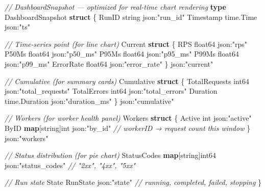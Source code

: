 \documentclass[
]{article}
\newenvironment{Shaded}{}{}
\newcommand{\CommentTok}[1]{\textcolor[rgb]{0.38,0.63,0.69}{\textit{#1}}}
\newcommand{\DataTypeTok}[1]{\textcolor[rgb]{0.56,0.13,0.00}{#1}}
\newcommand{\KeywordTok}[1]{\textcolor[rgb]{0.00,0.44,0.13}{\textbf{#1}}}
\newcommand{\NormalTok}[1]{#1}
\newcommand{\OperatorTok}[1]{\textcolor[rgb]{0.40,0.40,0.40}{#1}}
\newcommand{\StringTok}[1]{\textcolor[rgb]{0.25,0.44,0.63}{#1}}
\begin{document}
\begin{Shaded}
\begin{Highlighting}[]
\CommentTok{// DashboardSnapshot — optimized for real{-}time chart rendering}
\KeywordTok{type}\NormalTok{ DashboardSnapshot }\KeywordTok{struct} \OperatorTok{\{}
\NormalTok{    RunID     }\DataTypeTok{string}    \StringTok{\textasciigrave{}json:"run\_id"\textasciigrave{}}
\NormalTok{    Timestamp time}\OperatorTok{.}\NormalTok{Time }\StringTok{\textasciigrave{}json:"ts"\textasciigrave{}}

    \CommentTok{// Time{-}series point (for line chart)}
\NormalTok{    Current }\KeywordTok{struct} \OperatorTok{\{}
\NormalTok{        RPS       }\DataTypeTok{float64}       \StringTok{\textasciigrave{}json:"rps"\textasciigrave{}}
\NormalTok{        P50Ms     }\DataTypeTok{float64}       \StringTok{\textasciigrave{}json:"p50\_ms"\textasciigrave{}}
\NormalTok{        P95Ms     }\DataTypeTok{float64}       \StringTok{\textasciigrave{}json:"p95\_ms"\textasciigrave{}}
\NormalTok{        P99Ms     }\DataTypeTok{float64}       \StringTok{\textasciigrave{}json:"p99\_ms"\textasciigrave{}}
\NormalTok{        ErrorRate }\DataTypeTok{float64}       \StringTok{\textasciigrave{}json:"error\_rate"\textasciigrave{}}
    \OperatorTok{\}} \StringTok{\textasciigrave{}json:"current"\textasciigrave{}}

    \CommentTok{// Cumulative (for summary cards)}
\NormalTok{    Cumulative }\KeywordTok{struct} \OperatorTok{\{}
\NormalTok{        TotalRequests }\DataTypeTok{int64}         \StringTok{\textasciigrave{}json:"total\_requests"\textasciigrave{}}
\NormalTok{        TotalErrors   }\DataTypeTok{int64}         \StringTok{\textasciigrave{}json:"total\_errors"\textasciigrave{}}
\NormalTok{        Duration      time}\OperatorTok{.}\NormalTok{Duration }\StringTok{\textasciigrave{}json:"duration\_ms"\textasciigrave{}}
    \OperatorTok{\}} \StringTok{\textasciigrave{}json:"cumulative"\textasciigrave{}}

    \CommentTok{// Workers (for worker health panel)}
\NormalTok{    Workers }\KeywordTok{struct} \OperatorTok{\{}
\NormalTok{        Active  }\DataTypeTok{int}            \StringTok{\textasciigrave{}json:"active"\textasciigrave{}}
\NormalTok{        ByID    }\KeywordTok{map}\OperatorTok{[}\DataTypeTok{string}\OperatorTok{]}\DataTypeTok{int} \StringTok{\textasciigrave{}json:"by\_id"\textasciigrave{}} \CommentTok{// workerID → request count this window}
    \OperatorTok{\}} \StringTok{\textasciigrave{}json:"workers"\textasciigrave{}}

    \CommentTok{// Status distribution (for pie chart)}
\NormalTok{    StatusCodes }\KeywordTok{map}\OperatorTok{[}\DataTypeTok{string}\OperatorTok{]}\DataTypeTok{int64} \StringTok{\textasciigrave{}json:"status\_codes"\textasciigrave{}} \CommentTok{// "2xx", "4xx", "5xx"}

    \CommentTok{// Run state}
\NormalTok{    State RunState }\StringTok{\textasciigrave{}json:"state"\textasciigrave{}} \CommentTok{// running, completed, failed, stopping}
\OperatorTok{\}}
\end{Highlighting}
\end{Shaded}
\end{document}
